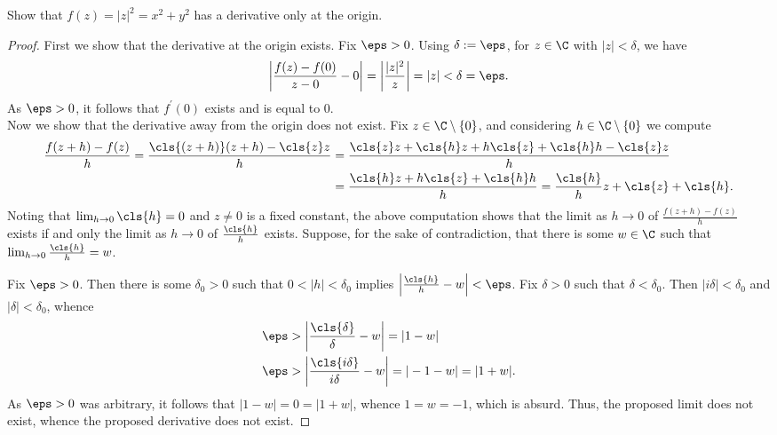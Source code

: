 \documentclass[12pt]{article}
\begin{document}
\begin{homeworkProblem}
  Show that $ f(z) = |z|^{2} = x^{2}+y^{2} $  has a derivative only at the origin.
\begin{proof}
  First we show that the derivative at the origin exists. Fix $ \eps>0 $. Using $ \delta:=\eps $, for $ z\in \C $ with $ |z| < \delta $, we have 
  \begin{align*}
    \left|\frac{f(z) - f(0)}{ z - 0} - 0\right| = \left|\frac{|z|^{2}}{z}\right| = |z| < \delta = \eps.
  \end{align*}
  As $ \eps>0 $, it follows that $ f^{\prime}(0) $ exists and is equal to $ 0 $.\\

  Now we show that the derivative away from the origin does not exist. Fix $ z\in \C\setminus \{0\} $, and considering $ h\in \C\setminus \{0\} $ we compute
  \begin{align*}
    \frac{f(z+h)-f(z)}{h} = \frac{\cls{(z+h)}(z+h) - \cls{z}z}{h} &= \frac{\cls{z}z +\cls{h}z + h \cls{z} + \cls{h}h -\cls{z}z}{h}\\
    &= \frac{\cls{h}z + h \cls{z} + \cls{h}h}{h} = \frac{\cls{h}}{h}z + \cls{z} + \cls{h}.
  \end{align*}
  Noting that $ \lim_{h\to 0} \cls{h} = 0$ and $ z\neq 0 $ is a fixed constant, the above computation shows that the limit as $ h\to 0 $ of $  \frac{f(z+h)-f(z)}{h}$ exists if and only the limit as $ h \to 0$ of $ \frac{\cls{h}}{h} $ exists. Suppose, for the sake of contradiction, that there is some $ w\in \C $ such that $ \lim_{h\to 0} \frac{\cls{h}}{h} = w$.

  Fix $ \eps>0 $. Then there is some $ \delta_{0}>0 $ such that $ 0<|h|<\delta_{0} $ implies $ \left|\frac{\cls{h}}{h} - w\right| < \eps $. Fix $ \delta >0 $ such that $ \delta < \delta_{0} $. Then $ |i \delta| < \delta_{0} $ and $ | \delta| < \delta_{0} $, whence
  \begin{align*}
    \eps &> \left| \frac{\cls{\delta}}{\delta} - w\right| = |1-w|\\
    \eps &> \left| \frac{\cls{i\delta}}{i\delta} - w\right| = |-1-w| = |1+w|.
  \end{align*}
  As $ \eps>0 $ was arbitrary, it follows that $ |1-w| = 0 = |1+w| $, whence $ 1 = w = -1 $, which is absurd. Thus, the proposed limit does not exist, whence the proposed derivative does not exist.


\end{proof}
 
\end{homeworkProblem}
\end{document}
